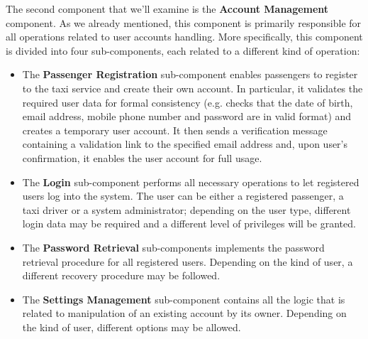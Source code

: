 \begin{figure}[H]
\centering
{}
\end{figure}

The second component that we'll examine is the \textbf{Account Management} component. As we already mentioned, this component is primarily responsible for all operations related to user accounts handling. More specifically, this component is divided into four sub-components, each related to a different kind of operation:
	\begin{itemize}
		\item The \textbf{Passenger Registration} sub-component enables passengers to register to the taxi service and create their own account. In particular, it validates the required user data for formal consistency (e.g. checks that the date of birth, email address, mobile phone number and password are in valid format) and creates a temporary user account. It then sends a verification message containing a validation link to the specified email address and, upon user's confirmation, it enables the user account for full usage.
		\item The \textbf{Login} sub-component performs all necessary operations to let registered users log into the system. The user can be either a registered passenger, a taxi driver or a system administrator; depending on the user type, different login data may be required and a different level of privileges will be granted. 
		\item The \textbf{Password Retrieval} sub-components implements the password retrieval procedure for all registered users. Depending on the kind of user, a different recovery procedure may be followed.
		\item The \textbf{Settings Management} sub-component contains all the logic that is related to manipulation of an existing account by its owner. Depending on the kind of user, different options may be allowed.
	\end{itemize}

